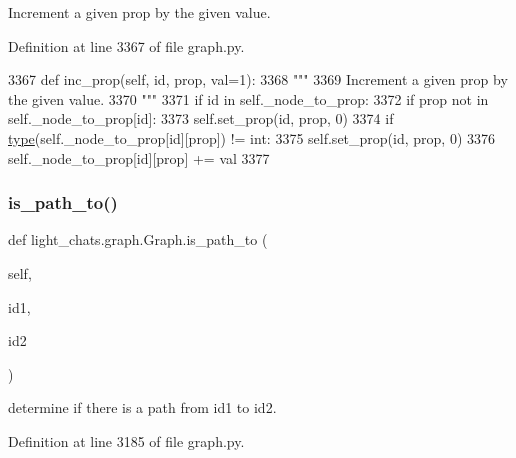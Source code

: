 \begin{DoxyVerb}Increment a given prop by the given value.
\end{DoxyVerb}
 

Definition at line 3367 of file graph.\+py.


\begin{DoxyCode}
3367     \textcolor{keyword}{def }inc\_prop(self, id, prop, val=1):
3368         \textcolor{stringliteral}{"""}
3369 \textcolor{stringliteral}{        Increment a given prop by the given value.}
3370 \textcolor{stringliteral}{        """}
3371         \textcolor{keywordflow}{if} id \textcolor{keywordflow}{in} self.\_node\_to\_prop:
3372             \textcolor{keywordflow}{if} prop \textcolor{keywordflow}{not} \textcolor{keywordflow}{in} self.\_node\_to\_prop[id]:
3373                 self.set\_prop(id, prop, 0)
3374             \textcolor{keywordflow}{if} \hyperlink{namespaceparlai_1_1agents_1_1tfidf__retriever_1_1build__tfidf_ad5dfae268e23f506da084a9efb72f619}{type}(self.\_node\_to\_prop[id][prop]) != int:
3375                 self.set\_prop(id, prop, 0)
3376             self.\_node\_to\_prop[id][prop] += val
3377 
\end{DoxyCode}
\mbox{\label{classlight__chats_1_1graph_1_1Graph_a04cfd7a5cc3c2df0c1bfec920d89d84c}} 
\subsubsection{\texorpdfstring{is\+\_\+path\+\_\+to()}{is\_path\_to()}}
{\footnotesize\ttfamily def light\+\_\+chats.\+graph.\+Graph.\+is\+\_\+path\+\_\+to (\begin{DoxyParamCaption}\item[{}]{self,  }\item[{}]{id1,  }\item[{}]{id2 }\end{DoxyParamCaption})}

\begin{DoxyVerb}determine if there is a path from id1 to id2.
\end{DoxyVerb}
 

Definition at line 3185 of file graph.\+py.


